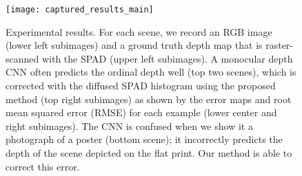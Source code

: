 \begin{figure}[t]
	\centering
	\texttt{[image: captured\_results\_main]}
	\caption{Experimental results. For each scene, we record an RGB image (lower left subimages) and a ground truth depth map that is raster-scanned with the SPAD (upper left subimages). A monocular depth CNN often predicts the ordinal depth well (top two scenes), which is corrected with the diffused SPAD histogram using the proposed method (top right subimages) as shown by the error maps and root mean squared error (RMSE) for each example (lower center and right subimages). The CNN is confused when we show it a photograph of a poster (bottom scene); it incorrectly predicts the depth of the scene depicted on the flat print. Our method is able to correct this error. }
	\label{fig:results_captured}
\end{figure}
